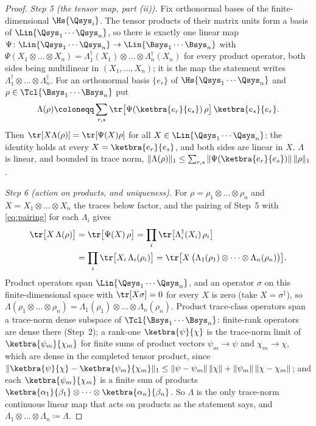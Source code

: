 \begin{proof}
\emph{Step 5 (the tensor map, part (ii)).} Fix orthonormal bases of the
finite-dimensional $\Hs{\Qsys_i}$. The tensor products of their matrix units
form a basis of $\Lin{\Qsys_1\cdots\Qsys_n}$, so there is exactly one linear
map $\Psi\colon\Lin{\Qsys_1\cdots\Qsys_n}\to\Lin{\Bsys_1\cdots\Bsys_n}$ with
$\Psi(X_1\otimes\dots\otimes X_n)=\Lambda_1^{\dagger}(X_1)\otimes\dots\otimes
\Lambda_n^{\dagger}(X_n)$ for every product operator, both sides being
multilinear in $(X_1,\dots,X_n)$; it is the map the statement writes
$\Lambda_1^{\dagger}\otimes\dots\otimes\Lambda_n^{\dagger}$. For an
orthonormal basis $\{e_r\}$ of $\Hs{\Qsys_1\cdots\Qsys_n}$ and
$\rho\in\Tcl{\Bsys_1\cdots\Bsys_n}$ put
\begin{equation*}
  \Lambda(\rho)\coloneqq\sum_{r,s}\tr\big[\Psi(\ketbra{e_r}{e_s})\,\rho\big]\,
  \ketbra{e_s}{e_r}.
\end{equation*}
Then $\tr[X\Lambda(\rho)]=\tr[\Psi(X)\rho]$ for all
$X\in\Lin{\Qsys_1\cdots\Qsys_n}$: the identity holds at every
$X=\ketbra{e_r}{e_s}$, and both sides are linear in $X$. $\Lambda$ is linear,
and bounded in trace norm,
$\|\Lambda(\rho)\|_1\le\sum_{r,s}\|\Psi(\ketbra{e_r}{e_s})\|\,\|\rho\|_1$.

\emph{Step 6 (action on products, and uniqueness).} For
$\rho=\rho_1\otimes\dots\otimes\rho_n$ and $X=X_1\otimes\dots\otimes X_n$ the
traces below factor, and the pairing of Step~5 with \eqref{eq:pairing} for
each $\Lambda_i$ gives
\begin{equation*}
\begin{split}
  \tr\big[X\,\Lambda(\rho)\big]&=\tr\big[\Psi(X)\,\rho\big]
  =\prod_{i}\tr\big[\Lambda_i^{\dagger}(X_i)\,\rho_i\big]\\
  &=\prod_{i}\tr\big[X_i\,\Lambda_i(\rho_i)\big]
  =\tr\big[X\,\big(\Lambda_1(\rho_1)\otimes\dots\otimes\Lambda_n(\rho_n)\big)\big].
\end{split}
\end{equation*}
Product operators span $\Lin{\Qsys_1\cdots\Qsys_n}$, and an operator $\sigma$
on this finite-dimensional space with $\tr[X\sigma]=0$ for every $X$ is zero
(take $X=\sigma^{\dagger}$), so $\Lambda(\rho_1\otimes\dots\otimes\rho_n)
=\Lambda_1(\rho_1)\otimes\dots\otimes\Lambda_n(\rho_n)$. Product trace-class
operators span a trace-norm dense subspace of $\Tcl{\Bsys_1\cdots\Bsys_n}$:
finite-rank operators are dense there (Step~2); a rank-one
$\ketbra{\psi}{\chi}$ is the trace-norm limit of $\ketbra{\psi_m}{\chi_m}$ for
finite sums of product vectors $\psi_m\to\psi$ and $\chi_m\to\chi$, which are
dense in the completed tensor product, since
$\|\ketbra{\psi}{\chi}-\ketbra{\psi_m}{\chi_m}\|_1
\le\|\psi-\psi_m\|\,\|\chi\|+\|\psi_m\|\,\|\chi-\chi_m\|$; and each
$\ketbra{\psi_m}{\chi_m}$ is a finite sum of products
$\ketbra{\alpha_1}{\beta_1}\otimes\dots\otimes\ketbra{\alpha_n}{\beta_n}$. So
$\Lambda$ is the only trace-norm continuous linear map that acts on products
as the statement says, and $\Lambda_1\otimes\dots\otimes\Lambda_n\coloneqq
\Lambda$.


\end{proof}
